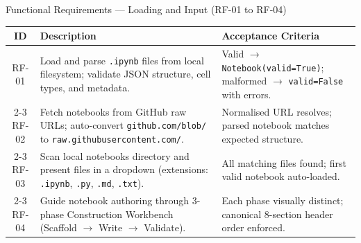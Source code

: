 \documentclass[aspectratio=169,11pt]{beamer}
\begin{document}
\begin{frame}[shrink]{Functional Requirements --- Loading and Input (RF-01 to RF-04)}
  \centering
  \scriptsize
  \renewcommand{\arraystretch}{0.85}
  \begin{tabularx}{\textwidth}{c X p{5.5cm}}
    \toprule
    \textbf{ID} & \textbf{Description} & \textbf{Acceptance Criteria} \\
    \midrule
    RF-01 & Load and parse \texttt{.ipynb} files from local filesystem; validate JSON structure, cell types, and metadata. & Valid $\rightarrow$ \texttt{Notebook(valid=True)}; malformed $\rightarrow$ \texttt{valid=False} with errors. \\
    \cmidrule{2-3}
    RF-02 & Fetch notebooks from GitHub raw URLs; auto-convert \texttt{github.com/blob/} to \texttt{raw.githubusercontent.com/}. & Normalised URL resolves; parsed notebook matches expected structure. \\
    \cmidrule{2-3}
    RF-03 & Scan local notebooks directory and present files in a dropdown (extensions: \texttt{.ipynb}, \texttt{.py}, \texttt{.md}, \texttt{.txt}). & All matching files found; first valid notebook auto-loaded. \\
    \cmidrule{2-3}
    RF-04 & Guide notebook authoring through 3-phase Construction Workbench (Scaffold $\rightarrow$ Write $\rightarrow$ Validate). & Each phase visually distinct; canonical 8-section header order enforced. \\
    \bottomrule
  \end{tabularx}
\end{frame}
\end{document}
